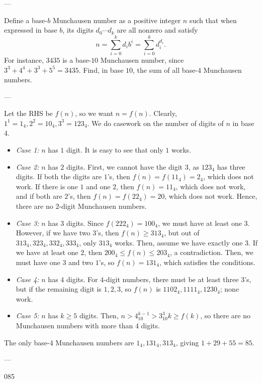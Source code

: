 
---

Define a base-$b$ Munchausen number as a positive integer $n$ such that when expressed in base $b$, its digits $d_0\cdots d_k$ are all nonzero and satisfy \[n=\sum_{i=0}^k d_ib^i=\sum_{i=0}^k d_i^{d_i}.\]
For instance, $3435$ is a base-$10$ Munchausen number, since $3^3+4^4+3^3+5^5=3435$. Find, in base $10$, the sum of all base-$4$ Munchausen numbers.

---

Let the RHS be $f(n)$, so we want $n=f(n)$. Clearly, $1^1=1_4,2^2=10_4,3^3=123_4$. We do casework on the number of digits of $n$ in base $4$.

\begin{itemize}
    \item \textit{Case 1:} $n$ has $1$ digit. It is easy to see that only $1$ works.

    \item \textit{Case 2:} $n$ has $2$ digits. First, we cannot have the digit $3$, as $123_4$ has three digits. If both the digits are $1$'s, then $f(n)=f(11_4)=2_4$, which does not work. If there is one $1$ and one $2$, then $f(n)=11_4$, which does not work, and if both are $2$'s, then $f(n)=f(22_4)=20$, which does not work. Hence, there are no $2$-digit Munchausen numbers.

    \item \textit{Case 3:} $n$ has $3$ digits. Since $f(222_4)=100_4$, we must have at least one $3$. However, if we have two $3$'s, then $f(n)\ge 313_4$, but out of $313_4,323_4,332_4,333_4$, only $313_4$ works. Then, assume we have exactly one $3$. If we have at least one $2$, then $200_4\le f(n)\le 203_4$, a contradiction. Then, we must have one $3$ and two $1$'s, so $f(n)=131_4$, which satisfies the conditions.

    \item \textit{Case 4:} $n$ has $4$ digits. For $4$-digit numbers, there must be at least three $3$'s, but if the remaining digit is $1,2,3$, so $f(n)$ is $1102_4,1111_4,1230_4$; none work.

    \item \textit{Case 5:} $n$ has $k\ge 5$ digits. Then, $n>4_{10}^{k-1}>3_{10}^3 k\ge f(k)$, so there are no Munchausen numbers with more than $4$ digits.
\end{itemize}

The only base-4 Munchausen numbers are $1_4,131_4,313_4$, giving $1+29+55=85$.

---

085
